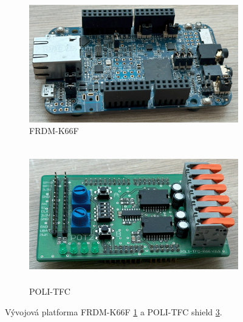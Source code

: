 \begin{figure}[h]
    \begin{subfigure}{0.45\textwidth}
        \includegraphics[width=\textwidth]{Figures/FRDM-K66F.png} 
        \caption{FRDM-K66F}
        \label{fig:FRDM-K66F}
    \end{subfigure}
    \hfill
    \begin{subfigure}{0.48\textwidth}
    \includegraphics[width=0.9\linewidth, height=6cm]{Figures/POLI-TFC.png}
    \caption{POLI-TFC}
    \label{fig:POLI-TFC}
\end{subfigure}

    \caption{Vývojová platforma FRDM-K66F \ref{fig:FRDM-K66F} a POLI-TFC shield \ref{fig:POLI-TFC}.}
\end{figure}

\endinput
